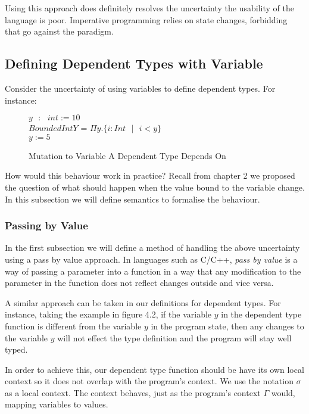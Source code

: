 \documentclass[a4paper,12pt]{report}
\begin{document}
\par
Using this approach does definitely resolves the uncertainty the usability of 
the language is poor. Imperative programming relies on state changes, forbidding 
that go against the paradigm. 

\subsection{Defining Dependent Types with Variable}
Consider the uncertainty of using variables to define dependent types. For 
instance: 

\begin{figure} [H]
  \begin{center}
    $y\text{ }:\text{ }int := 10$ \\
    $BoundedIntY$ = $\Pi y. \{i : Int\text{ }|\text{ }i < y\}$ \\ 
    $y := 5$
  \end{center}
  \caption{Mutation to Variable A Dependent Type Depends On}
\end{figure}
\par
How would this behaviour work in practice? Recall from chapter 2 we proposed the 
question of what should happen when the value bound to the variable change. In 
this subsection we will define semantics to formalise the behaviour.

\subsubsection{Passing by Value}
In the first subsection we will define a method of handling the above 
uncertainty using a pass by value approach. In languages such as C/C++, 
\textit{pass by value} \cite{pbv} is a way of passing a parameter into a 
function in a way that any modification to the parameter in the function does 
not reflect changes outside and vice versa. 

\par
A similar approach can be taken in our definitions for dependent types. For 
instance, taking the example in figure 4.2, if the variable $y$ in the dependent 
type function is different from the variable $y$ in the program state, then any 
changes to the variable $y$ will not effect the type definition and the program 
will stay well typed. 

\par
In order to achieve this, our dependent type function should be have its own 
local context so it does not overlap with the program's context. We use the 
notation $\sigma$ as a local context. The context behaves, just as the program's 
context $\Gamma$ would, mapping variables to values.
\end{document}
